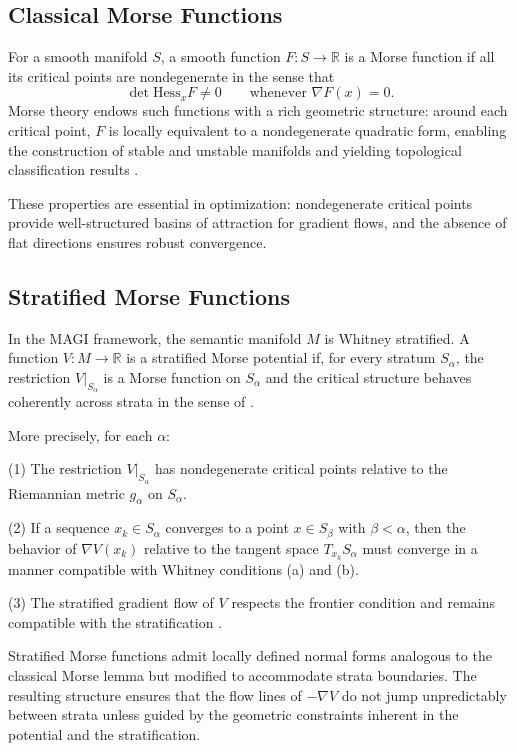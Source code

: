 \documentclass[12pt]{article}
\begin{document}
\subsection*{Classical Morse Functions}

For a smooth manifold $S$, a smooth function $F : S \to \mathbb{R}$ is a Morse function if all its critical points are nondegenerate in the sense that
\[
\det \mathrm{Hess}_x F \neq 0
\qquad
\text{whenever } \nabla F(x) = 0.
\]
Morse theory endows such functions with a rich geometric structure: around each critical point, $F$ is locally equivalent to a nondegenerate quadratic form, enabling the construction of stable and unstable manifolds and yielding topological classification results \citep{Milnor1963}.

These properties are essential in optimization: nondegenerate critical points provide well-structured basins of attraction for gradient flows, and the absence of flat directions ensures robust convergence.

\subsection*{Stratified Morse Functions}

In the MAGI framework, the semantic manifold $M$ is Whitney stratified. A function $V : M \to \mathbb{R}$ is a stratified Morse potential if, for every stratum $S_\alpha$, the restriction $V|_{S_\alpha}$ is a Morse function on $S_\alpha$ and the critical structure behaves coherently across strata in the sense of \cite{GoreskyMacPherson1988,Pflaum2000}.

More precisely, for each $\alpha$:

(1) The restriction $V|_{S_\alpha}$ has nondegenerate critical points relative to the Riemannian metric $g_\alpha$ on $S_\alpha$.

(2) If a sequence $x_k \in S_\alpha$ converges to a point $x \in S_\beta$ with $\beta < \alpha$, then the behavior of $\nabla V(x_k)$ relative to the tangent space $T_{x_k}S_\alpha$ must converge in a manner compatible with Whitney conditions (a) and (b).

(3) The stratified gradient flow of $V$ respects the frontier condition and remains compatible with the stratification \citep{Bredon1970,Chillingworth1976}.

Stratified Morse functions admit locally defined normal forms analogous to the classical Morse lemma but modified to accommodate strata boundaries. The resulting structure ensures that the flow lines of $-\nabla V$ do not jump unpredictably between strata unless guided by the geometric constraints inherent in the potential and the stratification.
\end{document}
